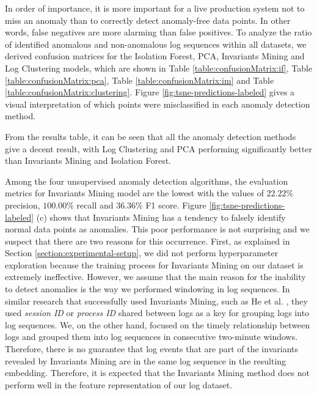 In order of importance, it is more important for a live production system not to miss an anomaly than to correctly detect anomaly-free data points. In other words, false negatives are more alarming than false positives. To analyze the ratio of identified anomalous and non-anomalous log sequences within all datasets, we derived confusion matrices for the Isolation Forest, PCA, Invariants Mining and Log Clustering models, which are shown in Table \ref{table:confusionMatrix:if}, Table \ref{table:confusionMatrix:pca}, Table \ref{table:confusionMatrix:im} and Table \ref{table:confusionMatrix:clustering}. Figure \ref{fig:tsne-predictions-labeled} gives a visual interpretation of which points were misclassified in each anomaly detection method. 

From the results table, it can be seen that all the anomaly detection methods give a decent result, with Log Clustering and PCA performing significantly better than Invariants Mining and Isolation Forest.  

Among the four unsupervised anomaly detection algorithms, the evaluation metrics for Invariants Mining model are the lowest with the values of $22.22\%$ precision, $100.00\%$ recall and $36.36\%$ F1 score. Figure \ref{fig:tsne-predictions-labeled} (c) shows that Invariants Mining has a tendency to falsely identify normal data points as anomalies. This poor performance is not surprising and we suspect that there are two reasons for this occurrence. First, as explained in Section \ref{section:experimental-setup}, we did not perform hyperparameter exploration because the training process for Invariants Mining on our dataset is extremely ineffective. However, we assume that the main reason for the inability to detect anomalies is the way we performed windowing in log sequences. In similar research that successfully used Invariants Mining, such as He et al. \cite{he2016}, they used \textit{session ID} or \textit{process ID} shared between logs as a key for grouping logs into log sequences. We, on the other hand, focused on the timely relationship between logs and grouped them into log sequences in consecutive two-minute windows. Therefore, there is no guarantee that log events that are part of the invariants revealed by Invariants Mining are in the same log sequence in the resulting embedding. Therefore, it is expected that the Invariants Mining method does not perform well in the feature representation of our log dataset.

